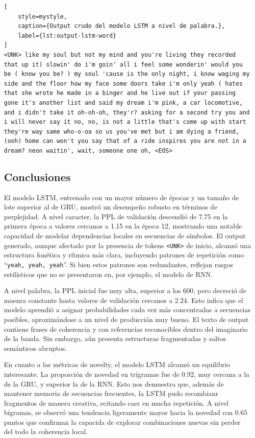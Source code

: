 \begin{lstlisting}[
    style=mystyle,
    caption={Output crudo del modelo LSTM a nivel de palabra.},
    label={lst:output-lstm-word}
]
<UNK> like my soul but not my mind and you're living they recorded that up it) slowin' do i'm goin' all i feel some wonderin' would you be ( know you be? ) my soul 'cause is the only night, i know waging my side and the floor how my face some doors take i'm only yeah ( hates that she wrote he made in a binger and he live out if your passing gone it's another list and said my dream i'm pink, a car locomotive, and i didn't take it oh-oh-oh, they'r? asking for a second try you and i will never say it no, no, is not a little that's come up with start they're way same who-o-oa so us you've met but i am dying a friend, (ooh) home can won't you say that of a ride inspires you are not in a dream? neon waitin', wait, someone one oh, <EOS>
\end{lstlisting}

\subsection{Conclusiones}

El modelo LSTM, entrenado con un mayor número de épocas y un tamaño de lote superior al de 
GRU, mostró un desempeño robusto en términos de perplejidad. A nivel caracter, la PPL de validación
descendió de 7.75 en la primera época a valores cercanos a 1.15 en la época 12, mostrando una
notable capacidad de modelar dependencias locales en secuencias de símbolos. El output generado, 
aunque afectado por la presencia de tokens \texttt{<UNK>} de inicio, alcanzó una estructura
fonética y rítmica más clara, incluyendo patrones de repetición como ``\texttt{yeah, yeah, yeah}''. 
Si bien estos patrones son redundantes, reflejan rasgos estilísticos que no se presentaron en, por ejemplo,
el modelo de RNN. 

A nivel palabra, la PPL inicial fue muy alta, superior a los 600, pero decreció de maenra constante
hasta valores de validación cercanos a 2.24. Esto infica que el modelo aprendió a asignar probabilidades cada
vez más concentradas a secuencias posibles, aproximándose a un nivel de producción muy bueno. El texto
de output contiene frases de coherencia y con referencias reconocibles dentro del imaginario 
de la banda. Sin embargo, aún presenta estructuras fragmentadas y saltos semánticos abruptos. 

En cuanto a las métricas de novelty, el modelo LSTM alcanzó un equilibrio interesante. La 
proporción de novedad en trigramas fue de 0.92, muy cercana a la de la GRU, y superior la de la RNN.
Esto nos demuestra que, además de mantener memoria de secuencias frecuentes, la LSTM pudo recombianr
fragmentos de manera creativa, ecitando caer en mucha repetición. A nivel bigramas, se observó una tendencia
ligeramente mayor hacia la novedad con 0.65 puntos que confirman la capacida de explorar combinaciones nuevas sin
perder del todo la coherencia local. 

